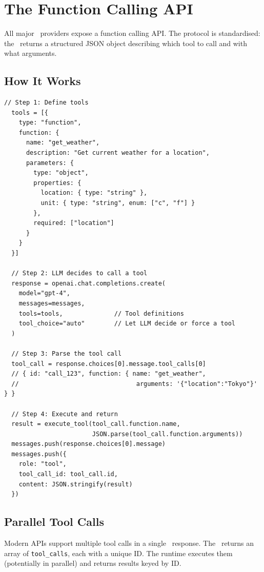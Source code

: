 \section{The Function Calling API}

All major \llm\ providers expose a function calling API. The protocol is standardised: the \llm\ returns a structured JSON object describing which tool to call and with what arguments.

\subsection{How It Works}

\begin{lstlisting}[caption=OpenAI function calling flow]
  // Step 1: Define tools
  tools = [{
    type: "function",
    function: {
      name: "get_weather",
      description: "Get current weather for a location",
      parameters: {
        type: "object",
        properties: {
          location: { type: "string" },
          unit: { type: "string", enum: ["c", "f"] }
        },
        required: ["location"]
      }
    }
  }]

  // Step 2: LLM decides to call a tool
  response = openai.chat.completions.create(
    model="gpt-4",
    messages=messages,
    tools=tools,              // Tool definitions
    tool_choice="auto"        // Let LLM decide or force a tool
  )

  // Step 3: Parse the tool call
  tool_call = response.choices[0].message.tool_calls[0]
  // { id: "call_123", function: { name: "get_weather",
  //                                arguments: '{"location":"Tokyo"}' } }

  // Step 4: Execute and return
  result = execute_tool(tool_call.function.name,
                        JSON.parse(tool_call.function.arguments))
  messages.push(response.choices[0].message)
  messages.push({
    role: "tool",
    tool_call_id: tool_call.id,
    content: JSON.stringify(result)
  })
\end{lstlisting}

\subsection{Parallel Tool Calls}

Modern APIs support multiple tool calls in a single \llm\ response. The \llm\ returns an array of \texttt{tool\_calls}, each with a unique ID. The runtime executes them (potentially in parallel) and returns results keyed by ID.

